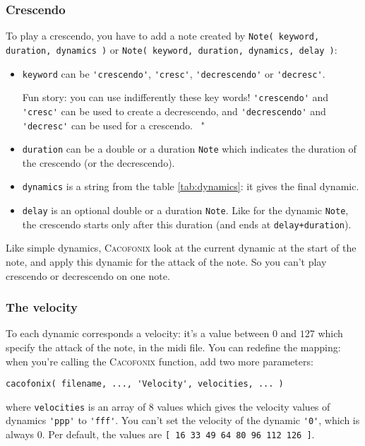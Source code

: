 \documentclass{article}
\newcommand\cacofonix{\textsc{Cacofonix}\xspace}
\newenvironment{meenv}{ \par \noindent \makebox[6em][r]{ \textcolor{mecolor}{Me}: " --~}}{~"}
\newcommand{ \me }[1]{%
\begin{meenv}%
	#1%
\end{meenv} }
\begin{document}
\subsubsection{Crescendo}
\label{sec:Crescendo}

To play a crescendo, you have to add a note created by \lstinline!Note( keyword, duration, dynamics )! or \lstinline!Note( keyword, duration, dynamics, delay )!:
\begin{itemize}
	\item \lstinline!keyword! can be \lstinline!'crescendo'!, \lstinline!'cresc'!, \lstinline!'decrescendo'! or \lstinline!'decresc'!.
		\me{Fun story: you can use indifferently these key words! \lstinline!'crescendo'! and \lstinline!'cresc'! can be used to create a decrescendo, and \lstinline!'decrescendo'! and \lstinline!'decresc'! can be used for a crescendo.}
	\item \lstinline!duration! can be a double or a duration \lstinline!Note! which indicates the duration of the crescendo (or the decrescendo).
	\item \lstinline!dynamics! is a string from the table \ref{tab:dynamics}: it gives the final dynamic.
	\item \lstinline!delay! is an optional double or a duration \lstinline!Note!. Like for the dynamic \lstinline!Note!, the crescendo starts only after this duration (and ends at \lstinline!delay+duration!).
\end{itemize}

Like simple dynamics, \cacofonix look at the current dynamic at the start of the note, and apply this dynamic for the attack of the note. So you can't play crescendo or decrescendo on one note.

\subsubsection{The velocity}
\label{sec:Velocity}

To each dynamic corresponds a velocity: it's a value between $0$ and $127$ which specify the attack of the note, in the midi file. You can redefine the mapping: when you're calling the \cacofonix function, add two more parameters:
\begin{lstlisting}
cacofonix( filename, ..., 'Velocity', velocities, ... )
\end{lstlisting}
where \lstinline!velocities! is an array of $8$ values which gives the velocity values of dynamics \lstinline!'ppp'! to \lstinline!'fff'!. You can't set the velocity of the dynamic \lstinline!'0'!, which is always $0$. Per default, the values are \lstinline![ 16 33 49 64 80 96 112 126 ]!.
\end{document}
